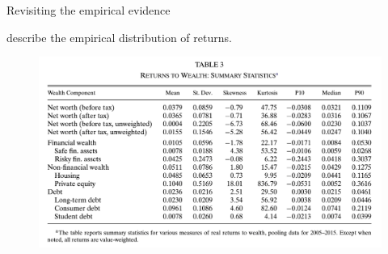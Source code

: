 \documentclass{beamer}
\begin{document}
\begin{frame}{Revisiting the empirical evidence}

\cite{aflgdmlp20} describe the empirical distribution of returns.



  \vfill
   \begin{figure}
    \centering
    \includegraphics[width=.75\linewidth]{Figures/Fagereng2020Table3.png}
  \end{figure}
  \vfill

\end{frame}
\end{document}
